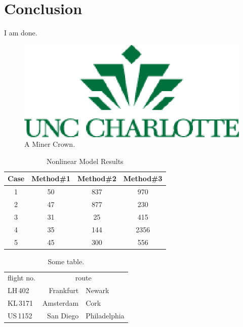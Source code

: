 \documentclass[12pt]{report}
\begin{document}
\chapter{Conclusion}
I am done. 

\begin{figure}
\begin{centering}
\includegraphics[scale=0.5]{UNCClogo.eps}
\par\end{centering}

\caption{\label{fig:Crown}A Miner Crown.}

\end{figure}

%
%

\begin{table}[ht]
 \caption{Nonlinear Model Results} %
 \centering %
 \begin{tabular}{cccc} %
 \hline\hline %
 Case & Method\#1 & Method\#2 & Method\#3 \\ [0.5ex] %
 \hline %
1 & 50 & 837 & 970\\ %
2 & 47 & 877 & 230\\
3 & 31 & 25& 415\\
4 & 35 & 144 & 2356 \\
5 & 45 & 300 & 556 \\ [1ex]
 \hline %
 \end{tabular} \label{table:nonlin} %
\end{table}

\begin{table}
\begin{tabular}{@{}lr@{--}l} %
flight no. & \multicolumn{2}{c}{route}\\
LH\,402 & Frankfurt & Newark\\
KL\,3171 & Amsterdam & Cork\\
US\,1152 & San Diego & Philadelphia
\end{tabular}
\caption{\label{tab:T1}Some table.}
\end{table}
\end{document}
